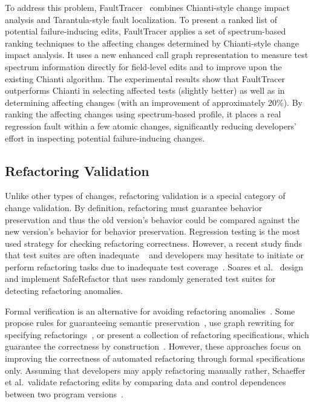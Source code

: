 To address this problem, FaultTracer~\cite{zhang2011localizing} combines Chianti-style change impact analysis and Tarantula-style fault localization. To present a ranked list of potential failure-inducing edits, FaultTracer applies a set of spectrum-based ranking techniques to the affecting changes determined by Chianti-style change impact analysis. It uses a new enhanced call graph representation to measure test spectrum information directly for field-level edits and to improve upon the existing Chianti algorithm. The experimental results show that FaultTracer outperforms Chianti in selecting affected tests (slightly better) as well as in determining affecting changes (with an improvement of approximately 20\%). By ranking the affecting changes using spectrum-based profile, it places a real regression fault within a few atomic changes, significantly reducing developers’ effort in inspecting potential failure-inducing changes.

\subsection{Refactoring Validation} 
\label{sec:refactoringvalidation} 

Unlike other types of changes, refactoring validation is a special category of change validation. By definition, refactoring must guarantee behavior preservation and thus the old version's behavior could be compared against the new version's behavior for behavior preservation. Regression testing is the most used strategy for checking refactoring correctness. However, a recent study finds that test suites are often inadequate ~\cite{Rachatasumrit2012:refactortest} and developers may hesitate to initiate or perform refactoring tasks due to inadequate test coverage~\cite{Kim2012:FSR}. Soares et al.~\cite{Soares:icse10} design and implement SafeRefactor that uses randomly generated test suites for detecting refactoring anomalies. 

Formal verification is an alternative for avoiding refactoring anomalies~\cite{Mens2004:SSR}. Some propose rules for guaranteeing semantic preservation~\cite{cornelio2010sound}, use graph rewriting for specifying refactorings~\cite{mens2005formalizing}, or present a collection of refactoring specifications, which guarantee the correctness by construction~\cite{overbey2010collection}. However, these approaches focus on improving the correctness of automated refactoring through formal specifications only. Assuming that developers may apply refactoring manually rather, Schaeffer et al.~validate refactoring edits by comparing data and control dependences between two program versions~\cite{Schaefer2010:refactoring}. 

